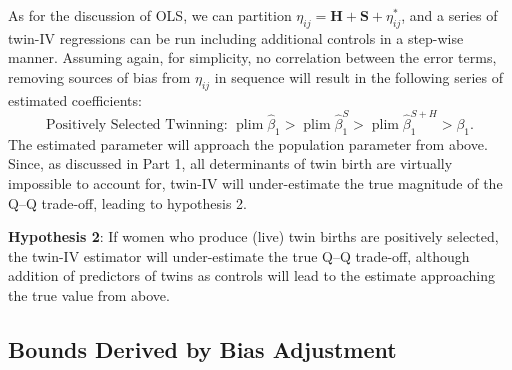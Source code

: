\documentclass[subeqn]{article}
\DeclareMathOperator{\plim}{plim}
\begin{document}
\begin{spacing}{1.4}
As for the discussion of OLS, we can partition $\eta_{ij}=\bm{H}+\bm{S}+\eta^*_{ij}$, and a series of twin-IV regressions can be run including additional controls in a step-wise manner. Assuming again, for simplicity, no correlation between the error terms, removing sources
of bias from $\eta_{ij}$ in sequence will result in the following series of estimated coefficients:
\begin{equation}
  \text{Positively Selected Twinning:\ \ \ } \plim \hat\beta_1 > \plim\hat\beta_1^{S} > \plim\hat\beta_1^{S+H} > \beta_1. \nonumber
\end{equation}
The estimated parameter will approach the population parameter from above. Since, as discussed in Part 1, all determinants of twin birth are virtually impossible to account for, twin-IV will under-estimate the true magnitude of the Q--Q trade-off, leading to hypothesis 2.

\noindent \textbf{Hypothesis 2}: If women who produce (live) twin births are
positively selected, the twin-IV estimator will under-estimate the true Q--Q trade-off, although addition of predictors of twins as controls will lead to the estimate approaching the true value from above.

\subsection{Bounds Derived by Bias Adjustment}


\end{spacing}
\end{document}
